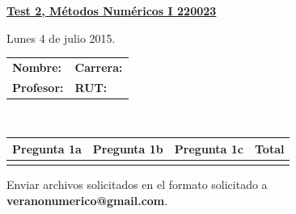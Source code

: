 \documentclass[11pt]{article}
\begin{document}
\hspace*{-1,5cm}

\vspace*{0.5cm} \centerline {\bf\underline{Test 2, M\'etodos Num\'ericos I 220023 }}
\centerline{\textrm{Lunes 4 de julio 2015.}}  \vspace{0.2cm}


\begin{center}
 \begin{tabular}{p{}p{}}
	\textbf{Nombre:}   &\textbf{Carrera:}\\
	\textbf{Profesor:} & \textbf{ RUT:}
 \end{tabular}
 \\
 \vspace{0.2cm}
 \begin{tabular}{||p{2.2cm}|p{2.2cm}|p{2.2cm}||p{2cm}||}
 \hline
 Pregunta 1a &  Pregunta 1b  & Pregunta 1c  &    Total\\
 \hline
 \vspace{1.5cm} & & &    \\
 \hline
 \end{tabular}
 \end{center}
 Enviar archivos solicitados en el formato solicitado a \textbf{veranonumerico@gmail.com}.
\end{document}
